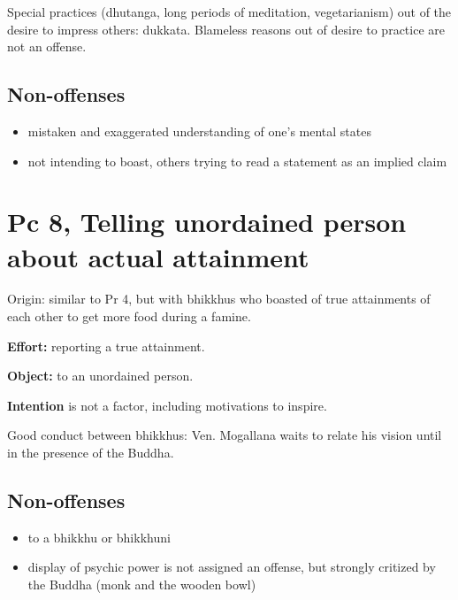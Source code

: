 Special practices (dhutanga, long periods of meditation, vegetarianism)
out of the desire to impress others: dukkata. Blameless reasons out of
desire to practice are not an offense.

\subsection{Non-offenses}

\begin{itemize}
\tightlist
\item
  mistaken and exaggerated understanding of one's mental states
\item
  not intending to boast, others trying to read a statement as an
  implied claim
\end{itemize}

\section{Pc 8, Telling unordained person about actual attainment}

Origin: similar to Pr 4, but with bhikkhus who boasted of true
attainments of each other to get more food during a famine.

\textbf{Effort:} reporting a true attainment.

\textbf{Object:} to an unordained person.

\textbf{Intention} is not a factor, including motivations to inspire.

Good conduct between bhikkhus: Ven. Mogallana waits to relate his vision
until in the presence of the Buddha.

\subsection{Non-offenses}

\begin{itemize}
\tightlist
\item
  to a bhikkhu or bhikkhuni
\item
  display of psychic power is not assigned an offense, but strongly
  critized by the Buddha (monk and the wooden bowl)
\end{itemize}

